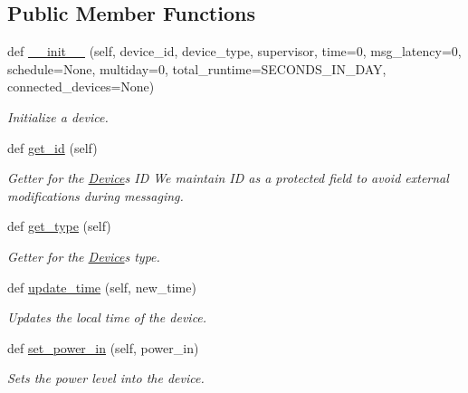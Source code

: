 \subsection*{Public Member Functions}
\begin{DoxyCompactItemize}
\item 
def \hyperlink{class_build_1_1_objects_1_1device_1_1_device_a6e8b7318d7bce8142f9c482c1852e744}{\+\_\+\+\_\+init\+\_\+\+\_\+} (self, device\+\_\+id, device\+\_\+type, supervisor, time=0, msg\+\_\+latency=0, schedule=None, multiday=0, total\+\_\+runtime=S\+E\+C\+O\+N\+D\+S\+\_\+\+I\+N\+\_\+\+D\+AY, connected\+\_\+devices=None)
\begin{DoxyCompactList}\small\item\em Initialize a device. \end{DoxyCompactList}\item 
def \hyperlink{class_build_1_1_objects_1_1device_1_1_device_a9cf14b880ef9cf103ba68554d3653593}{get\+\_\+id} (self)
\begin{DoxyCompactList}\small\item\em Getter for the \hyperlink{class_build_1_1_objects_1_1device_1_1_device}{Device}\textquotesingle{}s ID We maintain ID as a protected field to avoid external modifications during messaging. \end{DoxyCompactList}\item 
\mbox{\label{class_build_1_1_objects_1_1device_1_1_device_a0e0df5ad1dc3572210290c9c613777d4}} 
def \hyperlink{class_build_1_1_objects_1_1device_1_1_device_a0e0df5ad1dc3572210290c9c613777d4}{get\+\_\+type} (self)
\begin{DoxyCompactList}\small\item\em Getter for the \hyperlink{class_build_1_1_objects_1_1device_1_1_device}{Device}\textquotesingle{}s type. \end{DoxyCompactList}\item 
def \hyperlink{class_build_1_1_objects_1_1device_1_1_device_a12de2674ec41c3cfb31689fde187f6e0}{update\+\_\+time} (self, new\+\_\+time)
\begin{DoxyCompactList}\small\item\em Updates the local time of the device. \end{DoxyCompactList}\item 
def \hyperlink{class_build_1_1_objects_1_1device_1_1_device_a1cfab902786e2a6caf3a4b22341e9641}{set\+\_\+power\+\_\+in} (self, power\+\_\+in)
\begin{DoxyCompactList}\small\item\em Sets the power level into the device. \end{DoxyCompactList}\item 

\end{DoxyCompactItemize}
